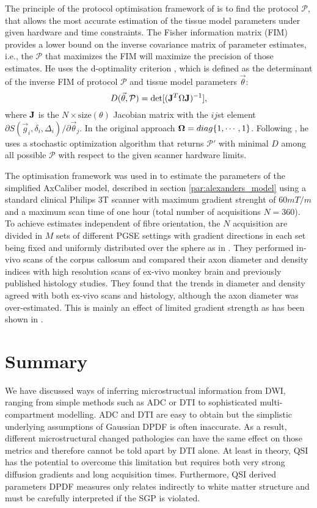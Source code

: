 The principle of the protocol optimisation framework of \cite{Alexander:2008} is to find the protocol $\mathcal{P}$, that allows the most accurate estimation of the tissue model parameters under given hardware and time constraints. The Fisher information matrix (FIM) provides a lower bound on the inverse covariance matrix of parameter estimates, i.e., the $\mathcal{P}$ that maximizes the FIM will maximize the precision of those estimates. He uses the d-optimality criterion \citep{OBrien:2003}, which is defined as the determinant of the inverse FIM of protocol $\mathcal{P}$ and tissue model parameters $\vec{\theta}$:
\begin{equation}
	D(\vec{\theta},\mathcal{P})=\det[(\mathbf{J}^T\Omega\mathbf{J})^{-1}], 
	\label{eq-optimality}
\end{equation}
where $\mathbf{J}$ is the $N\times \mbox{size}(\theta)$ Jacobian matrix with the $ij$st element $\partial S(\vec{g}_i,\delta_i,\Delta_i) / \partial \vec{\theta}_j$. In the original approach $\mathbf{\Omega}=diag\{1,\cdots,1\}$. Following \cite{Alexander:2008}, he uses a stochastic optimization algorithm \citep{Zelinka:2010} that returns $\mathcal{P}'$ with minimal $D$ among all possible $\mathcal{P}$ with respect to the given scanner hardware limits.

The optimisation framework was used in \citet{Alexander:2010} to estimate the parameters of the simplified AxCaliber model, described in section \ref{par:alexanders_model} using a standard clinical Philips 3T scanner with maximum gradient strenght of $60mT/m$ and a maximum scan time of one hour (total number of acquisitions $N=360$). To achieve estimates independent of fibre orientation, the $N$ acquisition are divided in $M$ sets of different PGSE settings with gradient directions in each set being fixed and uniformly distributed over the sphere as in \cite{Jones:2004a}. They performed in-vivo scans of the corpus callosum and compared their axon diameter and density indices with high resolution scans of ex-vivo monkey brain and previously published histology studies. They found that the trends in diameter and density agreed with both ex-vivo scans and histology, although the axon diameter was over-estimated. This is mainly an effect of limited gradient strength as has been shown in \cite{Dyrby:2010}.   
\section{Summary}
We have discussed ways of inferring microstructual information from DWI, ranging from simple methods such as ADC or DTI to sophisticated multi-compartment modelling. ADC and DTI are easy to obtain but the simplistic underlying assumptions of Gaussian DPDF is often inaccurate. As a result, different microstructural changed pathologies can have the same effect on those metrics and therefore cannot be told apart by DTI alone. At least in theory, QSI has the potential to overcome this limitation but requires both very strong diffusion gradients and long acquisition times. Furthermore, QSI derived parameters DPDF measures only relates indirectly to white matter structure and must be carefully interpreted if the SGP is violated.


